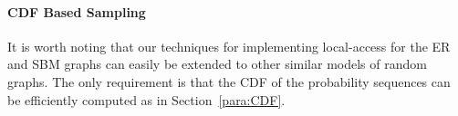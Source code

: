 \paragraph{CDF Based Sampling}
It is worth noting that our techniques for implementing local-access for the ER and SBM graphs
can easily be extended to other similar models of random graphs.
The only requirement is that the CDF of the probability sequences can be efficiently computed as in Section~\ref{para:CDF}.

